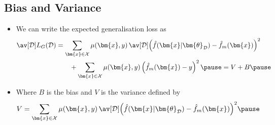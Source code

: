 \begin{slide}
\section[-2]{Bias and Variance}

\begin{PauseHighLight}
  \begin{itemize}
  \item We can write the expected generalisation loss as
    \begin{align*}
      \av[\mathcal{D}]{ L_G(\mathcal{D}) }
      &= \sum_{\bm{x}\in\mathcal{X}} \mu(\bm{x},y)\, 
      \av[\mathcal{D}]{ \left(\hat{f}(\bm{x}\vert \bm{\theta}_{\mathcal{D}}) -
      \hat{f}_m(\bm{x})\right)^2 } \\
        & \quad \quad +
          \sum_{\bm{x}\in\mathcal{X}} \mu(\bm{x},y) \left( \hat{f}_m(\bm{x})
      - y \right)^2 \pause
        = V + B\pause
    \end{align*}
  \item Where $B$ is the bias and $V$ is the variance defined by
    \begin{align*}
      V = \sum_{\bm{x}\in\mathcal{X}} \mu(\bm{x},y)\,
      \av[\mathcal{D}]{ \left(\hat{f}(\bm{x}\vert \bm{\theta}_{\mathcal{D}}) -
      \hat{f}_m(\bm{x})\right)^2 }\pause 
    \end{align*}
  \end{itemize}
\end{PauseHighLight}

\end{slide}



